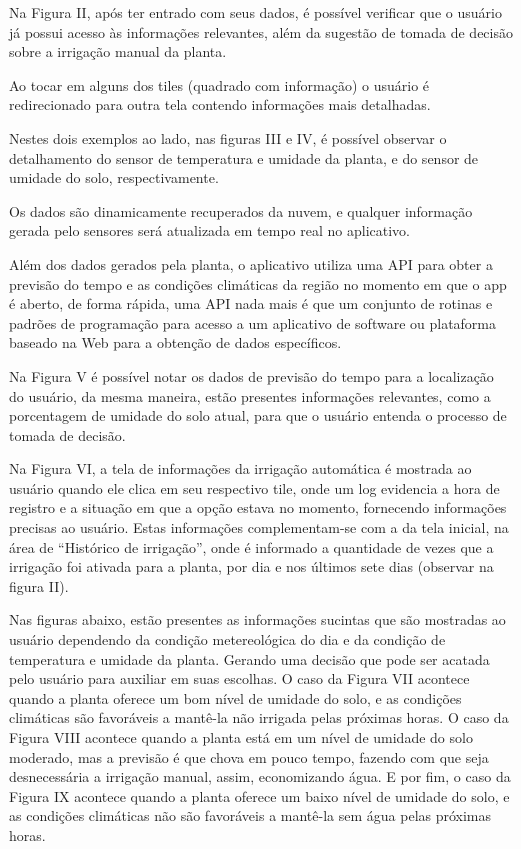 \documentclass[eso]{bcc}
\begin{document}
Na Figura II, após ter entrado com seus dados, é possível verificar que o usuário já possui 
acesso às informações relevantes, além da sugestão de tomada de decisão sobre a irrigação manual da planta.

Ao tocar em alguns dos tiles (quadrado com informação) o usuário é redirecionado para outra tela 
contendo informações mais detalhadas.

Nestes dois exemplos ao lado, nas figuras III e IV, é possível observar o detalhamento do sensor 
de temperatura e umidade da planta, e do sensor de umidade do solo, respectivamente.

Os dados são dinamicamente recuperados da nuvem, e qualquer informação gerada pelo sensores será 
atualizada em tempo real no aplicativo.

Além dos dados gerados pela planta, o aplicativo utiliza uma API para obter a previsão do tempo 
e as condições climáticas da região no momento em que o app é aberto, de forma rápida, uma API 
nada mais é que um conjunto de rotinas e padrões de programação para acesso a um aplicativo de 
software ou plataforma baseado na Web para a obtenção de dados específicos.

Na Figura V é possível notar os dados de previsão do tempo para  a localização do usuário, 
da mesma maneira, estão presentes informações relevantes, como a porcentagem de umidade do 
solo atual,  para que o usuário entenda o processo de tomada de decisão.

Na Figura VI, a tela de informações da irrigação automática é mostrada ao usuário quando ele clica 
em seu respectivo tile, onde um log evidencia a hora de registro e a situação em que a opção estava 
no momento, fornecendo informações precisas ao usuário. Estas informações complementam-se com a da 
tela inicial, na área de “Histórico de irrigação”, onde é informado a quantidade de vezes que a 
irrigação foi ativada para a planta, por dia e nos últimos sete dias (observar na figura II).

Nas figuras abaixo, estão presentes as informações sucintas que são mostradas ao usuário dependendo 
da condição metereológica do dia e da condição de temperatura e umidade da planta. Gerando uma 
decisão que pode ser acatada pelo usuário para auxiliar em suas escolhas.	O caso da Figura VII 
acontece quando a planta oferece um bom nível de umidade do solo, e as condições climáticas são 
favoráveis a mantê-la não irrigada pelas próximas horas.	O caso da Figura VIII acontece quando a 
planta está em um nível de umidade do solo moderado, mas a previsão é que chova em pouco tempo, 
fazendo com que seja desnecessária a irrigação manual, assim, economizando água. E por fim, o caso 
da Figura IX acontece quando a planta oferece um baixo nível de umidade do solo, e as condições 
climáticas não são favoráveis a mantê-la sem água pelas próximas horas.
\end{document}
